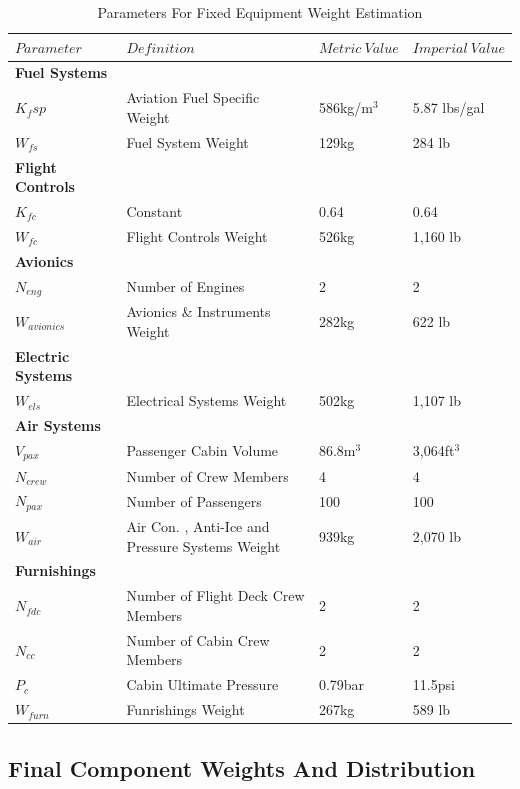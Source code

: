 \documentclass[11pt]{article}
\newcommand{\ra}[1]{\renewcommand{\arraystretch}{#1}}
\begin{document}
\FloatBarrier
\begin{table}[!h]
\centering %
\ra{1.3}
\begin{tabular}{@{}llll@{}}\toprule
$Parameter$ & $Definition$ & $Metric \ Value$ & $Imperial \ Value$ \\
\midrule
\textbf{Fuel Systems}\\
$K_fsp$& Aviation Fuel Specific Weight \cite{R5}& 586kg/m$^{3}$ & 5.87 lbs/gal \\
$W_{fs}$ & Fuel System Weight & 129kg & 284 lb \\ 
\textbf{Flight Controls}\\
$K_{fc}$ & Constant & 0.64 & 0.64  \\
$W_{fc}$ & Flight Controls Weight & 526kg & 1,160 lb \\ 
\textbf{Avionics}\\
$N_{eng}$ & Number of Engines & 2 & 2 \\
$W_{avionics}$ & Avionics \& Instruments Weight & 282kg & 622 lb \\
\textbf{Electric Systems}\\
$W_{els}$ & Electrical Systems Weight & 502kg & 1,107 lb \\
\textbf{Air Systems}\\
$V_{pax}$ & Passenger Cabin Volume & 86.8m$^{3}$ & 3,064ft$^{3}$ \\
$N_{crew}$ & Number of Crew Members & 4 & 4 \\
$N_{pax}$ & Number of Passengers & 100 & 100 \\
$W_{air}$ & Air Con. , Anti-Ice and Pressure Systems Weight & 939kg & 2,070 lb \\
\textbf{Furnishings}\\
$N_{fdc}$ & Number of Flight Deck Crew Members & 2 & 2 \\
$N_{cc}$ & Number of Cabin Crew Members & 2 & 2 \\
$P_{c}$ & Cabin Ultimate Pressure & 0.79bar & 11.5psi \\ 
$W_{furn}$ & Funrishings Weight & 267kg & 589 lb \\ 
\bottomrule
\end{tabular}
\caption{Parameters For Fixed Equipment Weight Estimation}
\label{table:fixed}
\end{table}
\FloatBarrier

\subsection{Final Component Weights And Distribution}
\end{document}
